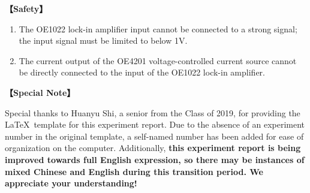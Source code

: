 \textbf{【Safety】}	
\begin{enumerate}
	\item The OE1022 lock-in amplifier input cannot be connected to a strong signal; the input signal must be limited to below 1V.
	\item The current output of the OE4201 voltage-controlled current source cannot be directly connected to the input of the OE1022 lock-in amplifier.
\end{enumerate}	
	
	
\textbf{【Special Note】}	

Special thanks to Huanyu Shi, a senior from the Class of 2019, for providing the \LaTeX \ template for this experiment report. \textcolor{fred}{Due to the absence of an experiment number in the original template, a self-named number has been added for ease of organization on the computer.} Additionally, \textbf{this experiment report is being improved towards full English expression, so there may be instances of mixed Chinese and English during this transition period. We appreciate your understanding!}
	

\clearpage
\tableofcontents		